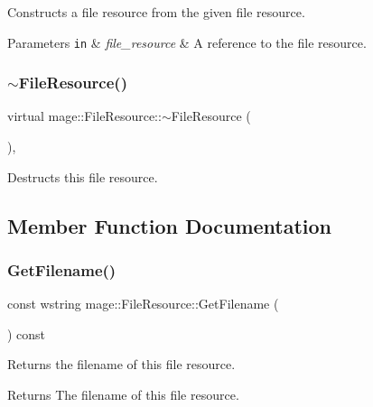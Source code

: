 Constructs a file resource from the given file resource.


\begin{DoxyParams}[1]{Parameters}
\mbox{\tt in}  & {\em file\+\_\+resource} & A reference to the file resource. \\
\hline
\end{DoxyParams}
\hypertarget{classmage_1_1_file_resource_a91ed639ff33311ebdfb54c80be7d6f62}{}\label{classmage_1_1_file_resource_a91ed639ff33311ebdfb54c80be7d6f62} 
\subsubsection{\texorpdfstring{$\sim$\+File\+Resource()}{~FileResource()}}
{\footnotesize\ttfamily virtual mage\+::\+File\+Resource\+::$\sim$\+File\+Resource (\begin{DoxyParamCaption}{ }\end{DoxyParamCaption})\hspace{0.3cm}{\ttfamily [virtual]}, {\ttfamily [default]}}

Destructs this file resource. 

\subsection{Member Function Documentation}
\hypertarget{classmage_1_1_file_resource_acdd02b3c226777fd003d8f56e0a5cc83}{}\label{classmage_1_1_file_resource_acdd02b3c226777fd003d8f56e0a5cc83} 
\subsubsection{\texorpdfstring{Get\+Filename()}{GetFilename()}}
{\footnotesize\ttfamily const wstring mage\+::\+File\+Resource\+::\+Get\+Filename (\begin{DoxyParamCaption}{ }\end{DoxyParamCaption}) const}

Returns the filename of this file resource.

\begin{DoxyReturn}{Returns}
The filename of this file resource. 
\end{DoxyReturn}
\hypertarget{classmage_1_1_file_resource_a8bc3308e018b352157bbcfe3a85519f9}{}\label{classmage_1_1_file_resource_a8bc3308e018b352157bbcfe3a85519f9} 
